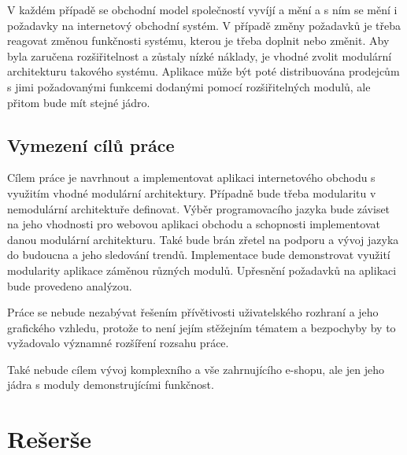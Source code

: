 \documentclass[11pt,twoside,a4paper]{book}
\begin{document}
V každém případě se obchodní model společností vyvíjí a mění a s ním se mění i požadavky na internetový obchodní systém. V případě změny požadavků je třeba reagovat změnou funkčnosti systému, kterou je třeba doplnit nebo změnit. Aby byla zaručena rozšiřitelnost a zůstaly nízké náklady, je vhodné zvolit modulární architekturu takového systému. Aplikace může být poté distribuována prodejcům s jimi požadovanými funkcemi dodanými pomocí rozšiřitelných modulů, ale přitom bude mít stejné jádro.

\section{Vymezení cílů práce}

Cílem práce je navrhnout a implementovat aplikaci internetového obchodu s využitím vhodné modulární architektury. Případně bude třeba modularitu v nemodulární architektuře definovat. Výběr programovacího jazyka bude záviset na jeho vhodnosti pro webovou aplikaci obchodu a schopnosti implementovat danou modulární architekturu. Také bude brán zřetel na podporu a vývoj jazyka do budoucna a jeho sledování trendů. Implementace bude demonstrovat využití modularity aplikace záměnou různých modulů. Upřesnění požadavků na aplikaci bude provedeno analýzou. 

Práce se nebude nezabývat řešením přívětivosti uživatelského rozhraní a jeho grafického vzhledu, protože to není jejím stěžejním tématem a bezpochyby by to vyžadovalo významné rozšíření rozsahu práce.

Také nebude cílem vývoj komplexního a vše zahrnujícího e-shopu, ale jen jeho jádra s moduly demonstrujícími funkčnost.





\chapter{Rešerše}
\label{sec:reserse}
\end{document}
